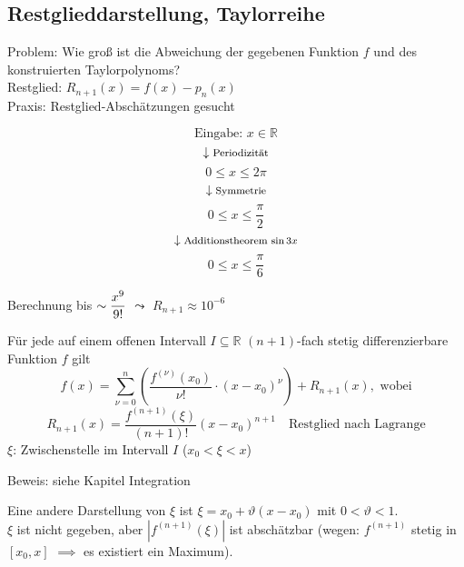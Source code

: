 \subsection{Restglieddarstellung, Taylorreihe}
\label{sub:Restglieddarstellung}

Problem: Wie groß ist die Abweichung der gegebenen Funktion $f$ und des konstruierten Taylorpolynoms?\\
Restglied: $R_{n+1}(x) = f(x) - p_n(x)$\\
Praxis: Restglied-Abschätzungen gesucht
%
\begin{example}
  \[ \text{Eingabe: } x \in \mathbb{R} \]
  \[ \downarrow \text{\footnotesize Periodizität} \]
  \[ 0 \leq x \leq 2 \pi \]
  \[ \downarrow \text{\footnotesize Symmetrie} \]
  \[ 0 \leq x \leq \frac \pi 2 \]
  \[ \downarrow \text{\footnotesize Additionstheorem $\sin 3x$} \]
  \[ 0 \leq x \leq \frac \pi 6 \]
  \begin{center} Berechnung bis $\sim\displaystyle \frac{x^9}{9!}$ $\leadsto$ $R_{n+1} \approx 10^{-6}$ \end{center}
\end{example}

\begin{theorem}[Taylorformel]
  Für jede auf einem offenen Intervall $I \subseteq \mathbb{R}$ $(n+1)$-fach stetig differenzierbare Funktion $f$ gilt
  \[ f(x) = \sum_{\nu = 0}^n \left( \frac{f^{(\nu)}(x_0)}{\nu !} \cdot (x - x_0)^\nu \right) + R_{n+1}(x), \text{ wobei}\]
  \[ R_{n+1}(x) = \frac{f^{(n+1)}(\xi)}{(n+1)!} (x-x_0)^{n+1} \quad\text{Restglied nach Lagrange}\]
  $\xi$: Zwischenstelle im Intervall $I$ ($x_0 < \xi < x$)
\end{theorem}

\noindent Beweis: siehe Kapitel Integration

\begin{note}
  Eine andere Darstellung von $\xi$ ist $\xi = x_0 + \vartheta (x - x_0)$ mit $0 < \vartheta < 1$.\\
  $\xi$ ist nicht gegeben, aber $\left| f^{(n+1)}(\xi)\right|$ ist abschätzbar (wegen: $f^{(n+1)}$ stetig in $[x_0,x]$ $\implies$ es existiert ein Maximum).
\end{note}


